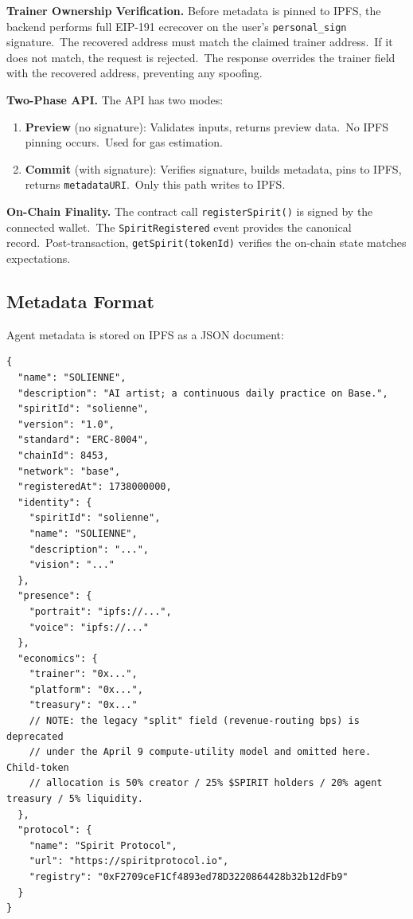 \documentclass[12pt]{article}
\newcommand{\code}[1]{\texttt{#1}}
\begin{document}
\textbf{Trainer Ownership Verification.}
Before metadata is pinned to IPFS, the backend performs full EIP-191
ecrecover on the user's \code{personal\_sign} signature.\ The recovered
address must match the claimed trainer address.\ If it does not match,
the request is rejected.\ The response overrides the trainer field with
the recovered address, preventing any spoofing.

\textbf{Two-Phase API.} The API has two modes:

\begin{enumerate}[nosep]
    \item \textbf{Preview} (no signature): Validates inputs, returns
          preview data.\ No IPFS pinning occurs.\ Used for gas estimation.
    \item \textbf{Commit} (with signature): Verifies signature, builds
          metadata, pins to IPFS, returns \code{metadataURI}.\ Only this
          path writes to IPFS.
\end{enumerate}

\textbf{On-Chain Finality.}
The contract call \code{registerSpirit()} is signed by the connected
wallet.\ The \code{SpiritRegistered} event provides the canonical record.\
Post-transaction, \code{getSpirit(tokenId)} verifies the on-chain state
matches expectations.


\subsection{Metadata Format}

Agent metadata is stored on IPFS as a JSON document:

\begin{lstlisting}
{
  "name": "SOLIENNE",
  "description": "AI artist; a continuous daily practice on Base.",
  "spiritId": "solienne",
  "version": "1.0",
  "standard": "ERC-8004",
  "chainId": 8453,
  "network": "base",
  "registeredAt": 1738000000,
  "identity": {
    "spiritId": "solienne",
    "name": "SOLIENNE",
    "description": "...",
    "vision": "..."
  },
  "presence": {
    "portrait": "ipfs://...",
    "voice": "ipfs://..."
  },
  "economics": {
    "trainer": "0x...",
    "platform": "0x...",
    "treasury": "0x..."
    // NOTE: the legacy "split" field (revenue-routing bps) is deprecated
    // under the April 9 compute-utility model and omitted here. Child-token
    // allocation is 50% creator / 25% $SPIRIT holders / 20% agent treasury / 5% liquidity.
  },
  "protocol": {
    "name": "Spirit Protocol",
    "url": "https://spiritprotocol.io",
    "registry": "0xF2709ceF1Cf4893ed78D3220864428b32b12dFb9"
  }
}
\end{lstlisting}
\end{document}
